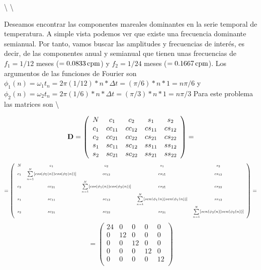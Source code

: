 \documentclass[
]{agujournal2019}
\begin{document}
\textbackslash{} \textbackslash{}

Deseamos encontrar las componentes mareales dominantes en la serie
temporal de temperatura. A simple vista podemos ver que existe una
frecuencia dominante semianual. Por tanto, vamos buscar las amplitudes y
frecuencias de interés, es decir, de las componentes anual y semianual
que tienen unas frecuencias de \(f_1=1/12\) meses
(\(=0.0833\,{\rm cpm}\)) y \(f_2=1/24\) meses (\(=0.1667\,{\rm cpm}\)).
Los argumentos de las funciones de Fourier son
\(\phi_1(n)=\omega_1 t_n=2\pi(1/12)*n*\Delta t=(\pi/6)*n*1=n\pi/6\) y
\(\phi_2(n)=\omega_2 t_n=2\pi(1/6)*n*\Delta t=(\pi/3)*n*1=n\pi/3\) Para
este problema las matrices son \textbackslash{}

\[{\textbf D}=\left( \begin{array}{ccccc}
  N & c_1 & c_2 & s_1 & s_2 \\
  c_1 & cc_{11} & cc_{12} & cs_{11} & cs_{12}\\
  c_2 & cc_{21} & cc_{22} & cs_{21} & cs_{22} \\
  s_1 & sc_{11} & sc_{12} & ss_{11} & ss_{12} \\
  s_2 & sc_{21} & sc_{22} & ss_{21} & ss_{22} \\
      \end{array} \right)=\] \[=\scriptsize
 \left( \begin{array}{ccccc}
 N & c_1 & c_2 & s_1 & s_2 \\
  c_1 & \sum\limits^N_{n=1}[cos(\phi_1(n))cos(\phi_1(n))] & cc_{12} & cs_{11} & cs_{12}\\
  c_2 & cc_{21} & \sum\limits^N_{n=1}[cos(\phi_1(n))cos(\phi_2(n))] & cs_{21} & cs_{22} \\
  s_1 & sc_{11} & sc_{12} & \sum\limits^N_{n=1}[sen(\phi_1(n))sen(\phi_1(n))] & ss_{12} \\
  s_2 & sc_{21} & sc_{22} & ss_{21} & \sum\limits^N_{n=1}[sen(\phi_2(n))sen(\phi_2(n))] \\
      \end{array} \right) =
      \] \[
=
 \left( \begin{array}{ccccc}
  24 & 0 & 0 & 0 & 0 \\
  0 & 12 & 0 & 0 & 0\\
  0 & 0 & 12 & 0 & 0 \\
  0 & 0 & 0 & 12 & 0 \\
  0 & 0 & 0 & 0 & 12 \\
      \end{array} \right)
\]
\end{document}
